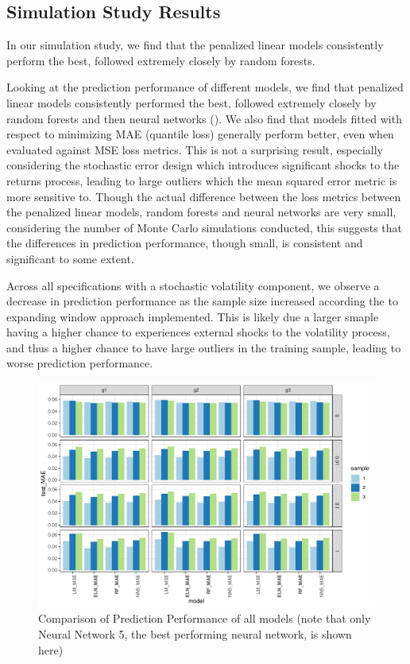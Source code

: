 \documentclass[11pt, a4paper, table]{article}
\begin{document}
\subsection{Simulation Study Results}


In our simulation study, we find that the penalized linear models consistently perform the best, followed extremely closely by random forests. 

Looking at the prediction performance of different models, we find that penalized linear models consistently performed the best, followed extremely closely by random forests and then neural networks (). We also find that models fitted with respect to minimizing MAE (quantile loss) generally perform better, even when evaluated against MSE loss metrics. This is not a surprising result, especially considering the stochastic error design which introduces significant shocks to the returns process, leading to large outliers which the mean squared error metric is more sensitive to. Though the actual difference between the loss metrics between the penalized linear models, random forests and neural networks are very small, considering the number of Monte Carlo simulations conducted, this suggests that the differences in prediction performance, though small, is consistent and significant to some extent.

Across all specifications with a stochastic volatility component, we observe a decrease in prediction performance as the sample size increased according the to expanding window approach implemented. This is likely due a larger smaple having a higher chance to experiences external shocks to the volatility process, and thus a higher chance to have large outliers in the training sample, leading to worse prediction performance. 


\begin{figure}
\begin{center}
\includegraphics{simulation_test_mae_small.pdf}
\caption{Comparison of Prediction Performance of all models (note that only Neural Network 5, the best performing neural network, is shown here)}
\end{center}
\end{figure}
\end{document}
